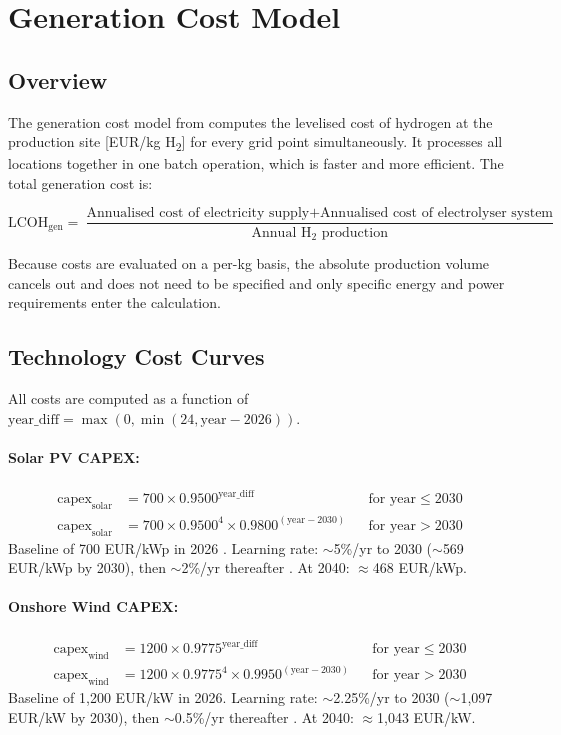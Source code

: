 \section{Generation Cost Model}
\label{sec:gen-cost}

\subsection{Overview}

The generation cost model from \cite{Collis2022} computes the levelised cost of hydrogen at the production site [EUR/kg H\textsubscript{2}] for every grid point simultaneously. It processes all locations together in one batch operation, which is faster and more efficient. The total generation cost is:

\begin{equation}
    \text{LCOH}_{\text{gen}} = \frac{\text{Annualised cost of electricity supply} + \text{Annualised cost of electrolyser system}}{\text{Annual H}_2\text{ production}}
\end{equation}

Because costs are evaluated on a per-kg basis, the absolute production volume cancels out and does not need to be specified and only specific energy and power requirements enter the calculation.

\subsection{Technology Cost Curves}

All costs are computed as a function of $\text{year\_diff} = \max(0, \min(24, \text{year} - 2026))$.

\paragraph{Solar PV CAPEX:}
\begin{align}
    \text{capex}_{\text{solar}} &= 700 \times 0.9500^{\text{year\_diff}} && \text{for year} \leq 2030 \\
    \text{capex}_{\text{solar}} &= 700 \times 0.9500^{4} \times 0.9800^{(\text{year}-2030)} && \text{for year} > 2030
\end{align}
Baseline of 700 EUR/kWp in 2026 \citep{IEA2026}. Learning rate: $\sim$5\%/yr to 2030 ($\sim$569 EUR/kWp by 2030), then $\sim$2\%/yr thereafter \citep{DNV2025}. At 2040: $\approx$468 EUR/kWp.

\paragraph{Onshore Wind CAPEX:}
\begin{align}
    \text{capex}_{\text{wind}} &= 1200 \times 0.9775^{\text{year\_diff}} && \text{for year} \leq 2030 \\
    \text{capex}_{\text{wind}} &= 1200 \times 0.9775^{4} \times 0.9950^{(\text{year}-2030)} && \text{for year} > 2030
\end{align}
Baseline of 1{,}200 EUR/kW in 2026. Learning rate: $\sim$2.25\%/yr to 2030 ($\sim$1{,}097 EUR/kW by 2030), then $\sim$0.5\%/yr thereafter \citep{IEA2026}. At 2040: $\approx$1{,}043 EUR/kW.

